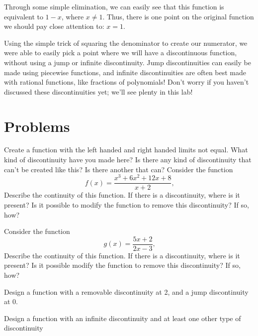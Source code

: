 \documentclass{ximera}
\begin{document}
Through some simple elimination, we can easily see that this function is equivalent to $1-x$, where $x \neq 1$. Thus, there is one point on the original function we should pay close attention to: $x=1$. 

Using the simple trick of squaring the denominator to create our numerator, we were able to easily pick a point where we will have a discontinuous function, without using a jump or infinite discontinuity. Jump discontinuities can easily be made using piecewise functions, and infinite discontinuities are often best made with rational functions, like fractions of polynomials! Don't worry if you haven't discussed these discontinuities yet; we'll see plenty in this lab!

\section{Problems}

\begin{question}
Create a function with the left handed and right handed limits not equal. What kind of discontinuity have you made here? Is there any kind of discontinuity that can't be created like this? Is there another that can?
Consider the function $$f(x) = \frac{x^3+6x^2+12x+8}{x+2} \text{,}$$ Describe the continuity of this function. If there is a discontinuity, where is it present? Is it possible to modify the function to remove this discontinuity? If so, how?
\begin{freeResponse}
\end{freeResponse}
\end{question}

\begin{question}
Consider the function $$g(x) = \frac{5x+2}{2x-3} \text{,}$$ Describe the continuity of this function. If there is a discontinuity, where is it present? Is it possible modify the function to remove this discontinuity? If so, how?
\begin{freeResponse}
\end{freeResponse}
\end{question}

\begin{question}
Design a function with a removable discontinuity at 2, and a jump discontinuity at 0.
\begin{freeResponse}
\end{freeResponse}
\end{question}

\begin{question}
Design a function with an infinite discontinuity and at least one other type of discontinuity
\begin{freeResponse}
\end{freeResponse}
\end{question}
\end{document}
